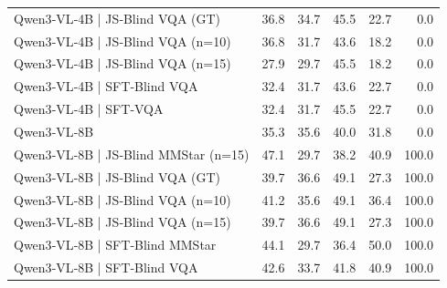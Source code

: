 \begin{tabular}{lrrrrr}
Qwen3‑VL‑4B | JS‑Blind VQA (GT) & 36.8 & 34.7 & 45.5 & 22.7 & 0.0 \\
Qwen3‑VL‑4B | JS‑Blind VQA (n=10) & 36.8 & 31.7 & 43.6 & 18.2 & 0.0 \\
Qwen3‑VL‑4B | JS‑Blind VQA (n=15) & 27.9 & 29.7 & 45.5 & 18.2 & 0.0 \\
Qwen3‑VL‑4B | SFT‑Blind VQA & 32.4 & 31.7 & 43.6 & 22.7 & 0.0 \\
Qwen3‑VL‑4B | SFT‑VQA & 32.4 & 31.7 & 45.5 & 22.7 & 0.0 \\
Qwen3‑VL‑8B & 35.3 & 35.6 & 40.0 & 31.8 & 0.0 \\
Qwen3‑VL‑8B | JS‑Blind MMStar (n=15) & 47.1 & 29.7 & 38.2 & 40.9 & 100.0 \\
Qwen3‑VL‑8B | JS‑Blind VQA (GT) & 39.7 & 36.6 & 49.1 & 27.3 & 100.0 \\
Qwen3‑VL‑8B | JS‑Blind VQA (n=10) & 41.2 & 35.6 & 49.1 & 36.4 & 100.0 \\
Qwen3‑VL‑8B | JS‑Blind VQA (n=15) & 39.7 & 36.6 & 49.1 & 27.3 & 100.0 \\
Qwen3‑VL‑8B | SFT‑Blind MMStar & 44.1 & 29.7 & 36.4 & 50.0 & 100.0 \\
Qwen3‑VL‑8B | SFT‑Blind VQA & 42.6 & 33.7 & 41.8 & 40.9 & 100.0 \\
\bottomrule
\end{tabular}
